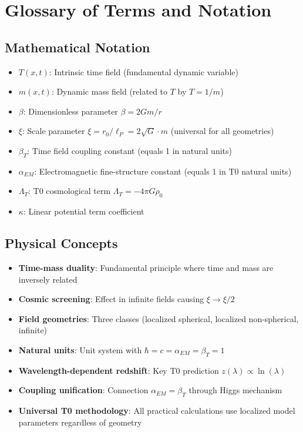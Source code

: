 \documentclass[12pt,a4paper]{article}
\begin{document}
	\section{Glossary of Terms and Notation}
	\label{app:glossary}
	
	\subsection{Mathematical Notation}
	\label{app:math_notation}
	
	\begin{itemize}
		\item $T(x,t)$: Intrinsic time field (fundamental dynamic variable)
		\item $m(x,t)$: Dynamic mass field (related to $T$ by $T = 1/m$)
		\item $\beta$: Dimensionless parameter $\beta = 2Gm/r$
		\item $\xi$: Scale parameter $\xi = r_0/\ell_P = 2\sqrt{G} \cdot m$ (universal for all geometries)
		\item $\beta_T$: Time field coupling constant (equals 1 in natural units)
		\item $\alpha_{EM}$: Electromagnetic fine-structure constant (equals 1 in T0 natural units)
		\item $\Lambda_T$: T0 cosmological term $\Lambda_T = -4\pi G \rho_0$
		\item $\kappa$: Linear potential term coefficient
	\end{itemize}
	
	\subsection{Physical Concepts}
	\label{app:physics_concepts}
	
	\begin{itemize}
		\item \textbf{Time-mass duality}: Fundamental principle where time and mass are inversely related
		\item \textbf{Cosmic screening}: Effect in infinite fields causing $\xi \to \xi/2$
		\item \textbf{Field geometries}: Three classes (localized spherical, localized non-spherical, infinite)
		\item \textbf{Natural units}: Unit system with $\hbar = c = \alpha_{EM} = \beta_T = 1$
		\item \textbf{Wavelength-dependent redshift}: Key T0 prediction $z(\lambda) \propto \ln(\lambda)$
		\item \textbf{Coupling unification}: Connection $\alpha_{EM} = \beta_T$ through Higgs mechanism
		\item \textbf{Universal T0 methodology}: All practical calculations use localized model parameters regardless of geometry
	\end{itemize}
	
\end{document}
